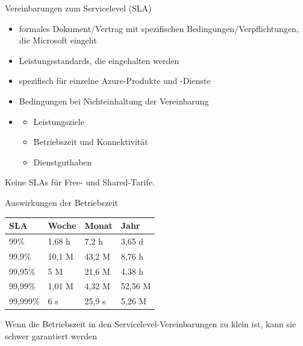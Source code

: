 
\begin{flashcard}[Definition]{Vereinbarungen zum Servicelevel (SLA)}
    \begin{itemize}
        \item formales Dokument/Vertrag mit spezifischen Bedingungen/Verpflichtungen, die Microsoft eingeht
        \item Leistungsstandards, die eingehalten werden
        \item spezifisch für einzelne Azure-Produkte und -Dienste
        \item Bedingungen bei Nichteinhaltung der Vereinbarung
        \item
            \begin{itemize}
                \item Leistungsziele
                \item Betriebszeit und Konnektivität
                \item Dienstguthaben
            \end{itemize}

    \end{itemize}
    Keine SLAs für Free- und Shared-Tarife.
\end{flashcard}

\begin{flashcard}[\ ]{Auswirkungen der Betriebszeit}
    \begin{tabular}{l|lll}
        SLA      &  Woche  & Monat  & Jahr    \\
        \hline
        99\%     &  1,68 h & 7,2 h  & 3,65 d  \\
        99,9\%   &  10,1 M & 43,2 M & 8,76 h  \\
        99,95\%  &  5 M    & 21,6 M & 4,38 h  \\
        99,99\%  &  1,01 M & 4,32 M & 52,56 M \\
        99,999\% &  6 s    & 25,9 s & 5,26 M  \\
    \end{tabular}

    \vspace{5mm}
    Wenn die Betriebszeit in den Servicelevel-Vereinbarungen zu klein ist, kann sie schwer garantiert werden
\end{flashcard}

